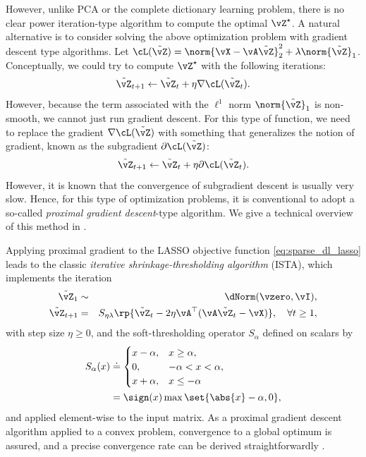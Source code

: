 \documentclass[../../book-main.tex]{subfiles}
\begin{document}
However, unlike PCA or the
complete dictionary learning problem, there is no clear power iteration-type
algorithm to compute the optimal \(\vZ^{\star}\). A natural
alternative is to consider
solving the above optimization problem with gradient descent type algorithms.
Let \(\cL(\tilde{\vZ}) = \norm{\vX - \vA\tilde{\vZ}}_{2}^{2} + \lambda
\norm{\tilde{\vZ}}_{1}\).
Conceptually, we could try to compute \(\vZ^{\star}\) with the following
iterations:
\begin{equation}
    \tilde{\vZ}_{t+1} \leftarrow \tilde{\vZ}_t + \eta \nabla \cL(\tilde{\vZ}_t).
\end{equation}
However, because the term associated with the \(\ell^1\) norm
\(\norm{\tilde{\vZ}}_{1}\)
is non-smooth, we cannot just run gradient descent. For this type of function,
we need to replace the gradient \(\nabla \cL(\tilde{\vZ})\) with something that
generalizes the notion of gradient, known as the subgradient \(\partial
\cL(\tilde{\vZ})\):
\begin{equation}
    \tilde{\vZ}_{t+1} \leftarrow \tilde{\vZ}_t + \eta \partial
    \cL(\tilde{\vZ}_t).
\end{equation}
However, it is known that the convergence of subgradient descent is usually very
slow. Hence, for this type of optimization problems, it is conventional to adopt
a so-called {\em proximal gradient descent}-type algorithm. We give a technical
overview of this method in .

Applying proximal gradient to the LASSO objective function
\eqref{eq:sparse_dl_lasso} leads to the classic \textit{iterative
shrinkage-thresholding algorithm} (ISTA), which implements the iteration
\begin{eqnarray}
    \tilde{\vZ}_{1} &\sim& \dNorm(\vzero, \vI), \\
    \tilde{\vZ}_{t + 1} &=& S_{\eta\lambda}\rp{\tilde{\vZ}_{t} - 2\eta
    \vA^{\top}(\vA\tilde{\vZ}_{t} - \vX)}, \quad \forall t \geq
    1,\label{eq:ista_update}
\end{eqnarray}
with step size \(\eta \geq 0\), and the soft-thresholding operator
\(S_{\alpha}\) defined on scalars by
\begin{align}
    S_{\alpha}(x) &
    \doteq
    \begin{cases}x - \alpha, & x \geq \alpha, \\ 0,
        & -\alpha < x < \alpha, \\ x + \alpha, & x \leq -\alpha
    \end{cases}
    \\
    &=
    \sign(x) \max \set{\abs{x} - \alpha, 0},
\end{align}
and applied element-wise to the input matrix.  As a proximal gradient descent
algorithm applied to a convex problem, convergence to a global optimum is
assured, and a precise convergence rate can be derived straightforwardly
\cite{Wright-Ma-2022}.
\end{document}
